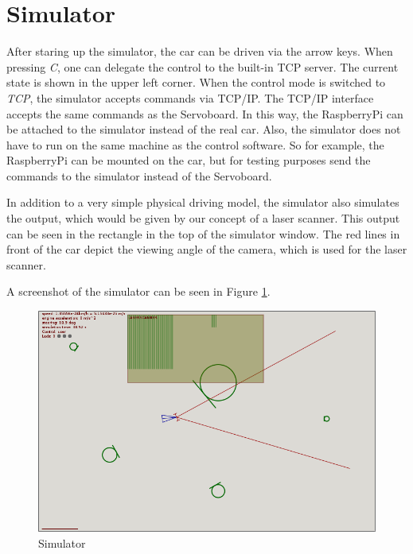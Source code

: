 \documentclass[a4paper
               ,10pt
               ,DIV=10 %
               ,BCOR=0.3cm
               ,pagesize %
               ,headings=small
               ,bibtotoc
               ]
               {scrartcl}
\begin{document}
\section{Simulator}

After staring up the simulator, the car can be driven via the arrow keys. When pressing \textit{C}, one can delegate the control to the built-in TCP server. The current state is shown in the upper left corner.
When the control mode is switched to \textit{TCP}, the simulator accepts commands via TCP/IP.
The TCP/IP interface accepts the same commands as the Servoboard.
In this way, the RaspberryPi can be attached to the simulator instead of the real car.
Also, the simulator does not have to run on the same machine as the control software.
So for example, the RaspberryPi can be mounted on the car, but for testing purposes send the commands to the simulator instead of the Servoboard.

In addition to a very simple physical driving model, the simulator also simulates the output, which would be given by our concept of a laser scanner. This output can be seen in the rectangle in the top of the simulator window. The red lines in front of the car depict the viewing angle of the camera, which is used for the laser scanner.

A screenshot of the simulator can be seen in Figure \ref{figsim}.

\begin{figure}[H]
\begin{center}
\includegraphics[width=15cm]{pic/sim.png}
\end{center}
\caption{Simulator}
\label{figsim}
\end{figure}
\end{document}
